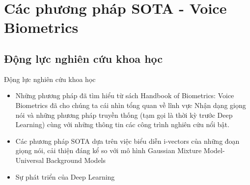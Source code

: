 \documentclass[notheorems, aspectratio=54]{beamer}
\begin{document}
\section{Các phương pháp SOTA - Voice Biometrics}
\subsection{Động lực nghiên cứu khoa học}
\begin{frame}{Động lực nghiên cứu khoa học}
		\begin{itemize}
		\item Những phương pháp đã tìm hiểu từ sách Handbook of Biometrics: Voice Biometrics đã cho chúng ta cái nhìn tổng quan về lĩnh vực Nhận dạng giọng nói và những phương pháp truyền thống (tạm gọi là thời kỳ trước Deep Learning) cùng với những thông tin các công trình nghiên cứu nổi bật.
		\item Các phương pháp SOTA dựa trên việc biểu diễn i-vectors của những
		đoạn giọng nói, cải thiện đáng kể so với mô hình Gaussian Mixture
		Model-Universal Background Models
		\item Sự phát triển của Deep Learning
	\end{itemize}
\end{frame}
\end{document}
